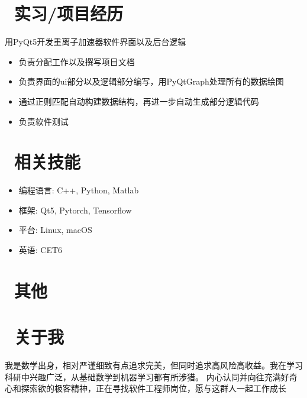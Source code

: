 \documentclass{resume}
\begin{document}
\section{\faUsers\ 实习/项目经历}
\begin{onehalfspacing}
用PyQt5开发重离子加速器软件界面以及后台逻辑
\begin{itemize}
  \item 负责分配工作以及撰写项目文档
  \item 负责界面的ui部分以及逻辑部分编写，用PyQtGraph处理所有的数据绘图
  \item 通过正则匹配自动构建数据结构，再进一步自动生成部分逻辑代码
  \item 负责软件测试
\end{itemize}
\end{onehalfspacing}


\section{\faCogs\ 相关技能}
\vspace{-1\baselineskip}
\begin{multicols}{2}
\begin{itemize}[parsep=0.5ex]
    \item 编程语言: C++, Python, Matlab
    \item 框架: Qt5, Pytorch, Tensorflow
    \item 平台: Linux, macOS
    \item 英语: CET6
\end{itemize}
\end{multicols}

\section{\faInfo\ 其他}

\section{\faGamepad\ 关于我}
我是数学出身，相对严谨细致有点追求完美，但同时追求高风险高收益。我在学习科研中兴趣广泛，从基础数学到机器学习都有所涉猎。
内心认同并向往充满好奇心和探索欲的极客精神，正在寻找软件工程师岗位，愿与这群人一起工作成长

%
%
\end{document}
